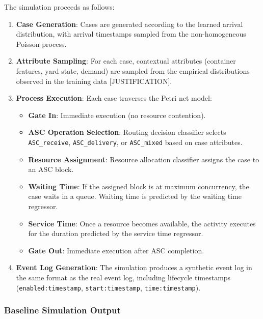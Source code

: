         The simulation proceeds as follows:
        
        \begin{enumerate}
            \item \textbf{Case Generation}: Cases are generated according to the learned arrival distribution, with arrival timestamps sampled from the non-homogeneous Poisson process.
            \item \textbf{Attribute Sampling}: For each case, contextual attributes (container features, yard state, demand) are sampled from the empirical distributions observed in the training data [JUSTIFICATION].
            \item \textbf{Process Execution}: Each case traverses the Petri net model:
            \begin{itemize}
                \item \textbf{Gate In}: Immediate execution (no resource contention).
                \item \textbf{ASC Operation Selection}: Routing decision classifier selects \texttt{ASC\_receive}, \texttt{ASC\_delivery}, or \texttt{ASC\_mixed} based on case attributes.
                \item \textbf{Resource Assignment}: Resource allocation classifier assigns the case to an ASC block.
                \item \textbf{Waiting Time}: If the assigned block is at maximum concurrency, the case waits in a queue. Waiting time is predicted by the waiting time regressor.
                \item \textbf{Service Time}: Once a resource becomes available, the activity executes for the duration predicted by the service time regressor.
                \item \textbf{Gate Out}: Immediate execution after ASC completion.
            \end{itemize}
            \item \textbf{Event Log Generation}: The simulation produces a synthetic event log in the same format as the real event log, including lifecycle timestamps (\texttt{enabled:timestamp}, \texttt{start:timestamp}, \texttt{time:timestamp}).
        \end{enumerate}

        \subsubsection{Baseline Simulation Output}
        
